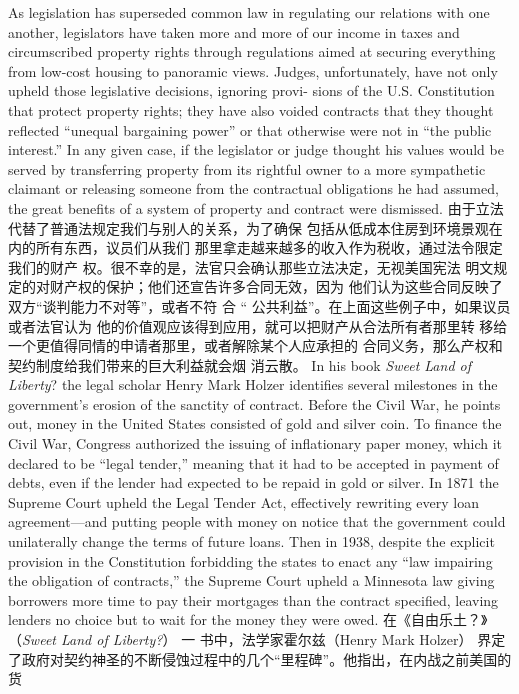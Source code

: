 \begin{paracol}{2}
As legislation has superseded common law in regulating our
relations with one another, legislators have taken more and
more of our income in taxes and circumscribed property rights
through regulations aimed at securing everything from low-cost housing to panoramic views. Judges, unfortunately, have
not only upheld those legislative decisions, ignoring provi-
sions of the U.S. Constitution that protect property rights;
they have also voided contracts that they thought reflected
``unequal bargaining power'' or that otherwise were not in
``the public interest.'' In any given case, if the legislator or
judge thought his values would be served by transferring
property from its rightful owner to a more sympathetic
claimant or releasing someone from the contractual obligations he had assumed, the great benefits of a system of property and contract were dismissed.
\switchcolumn
由于立法代替了普通法规定我们与别人的关系，为了确保
包括从低成本住房到环境景观在内的所有东西，议员们从我们
那里拿走越来越多的收入作为税收，通过法令限定我们的财产
权。很不幸的是，法官只会确认那些立法决定，无视美国宪法
明文规定的对财产权的保护；他们还宣告许多合同无效，因为
他们认为这些合同反映了双方“谈判能力不对等”，或者不符
合 “ 公共利益”。在上面这些例子中，如果议员或者法官认为
他的价值观应该得到应用，就可以把财产从合法所有者那里转
移给一个更值得同情的申请者那里，或者解除某个人应承担的
合同义务，那么产权和契约制度给我们带来的巨大利益就会烟
消云散。
\switchcolumn*
In his book \textit{Sweet Land of Liberty}? the legal scholar Henry
Mark Holzer identifies several milestones in the government's
erosion of the sanctity of contract. Before the Civil War, he
points out, money in the United States consisted of gold and silver coin. To finance the Civil War, Congress authorized the issuing of inflationary paper money, which it declared to be ``legal
tender,'' meaning that it had to be accepted in payment of
debts, even if the lender had expected to be repaid in gold or silver. In 1871 the Supreme Court upheld the Legal Tender Act,
effectively rewriting every loan agreement---and putting people with money on notice that the government could unilaterally change the terms of future loans. Then in 1938, despite the
explicit provision in the Constitution forbidding the states to
enact any ``law impairing the obligation of contracts,'' the
Supreme Court upheld a Minnesota law giving borrowers more
time to pay their mortgages than the contract specified, leaving
lenders no choice but to wait for the money they were owed.
\switchcolumn
在《自由乐土？》（\textit{Sweet Land of Liberty?}） 一 书中，法学家霍尔兹（Henry Mark Holzer） 界定了政府对契约神圣的不断侵蚀过程中的几个“里程碑”。他指出，在内战之前美国的货

\end{paracol}
